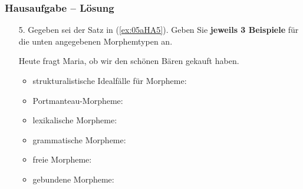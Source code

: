 \begin{frame}
\frametitle{Hausaufgabe -- Lösung}

\begin{enumerate}
	\item[5.] Gegeben sei der Satz in (\ref{ex:05aHA5}). Geben Sie \textbf{jeweils 3 Beispiele} für die unten angegebenen Morphemtypen an.
	
	\begin{exe}
		 Heute fragt Maria, ob wir den schönen Bären gekauft haben.
	\end{exe}
	
	\settowidth{}
	\begin{itemize}
		\item strukturalistische Idealfälle für Morpheme:
		\item[] 
		
		\item Portmanteau-Morpheme:
		\item[] 
		
		\item lexikalische Morpheme:
		\item[]  
		
		\item grammatische Morpheme:
		\item[] 
		
		\item freie Morpheme:
		\item[] 
		
		\item gebundene Morpheme:
		\item[] 
	\end{itemize}

\end{enumerate}

\end{frame}

